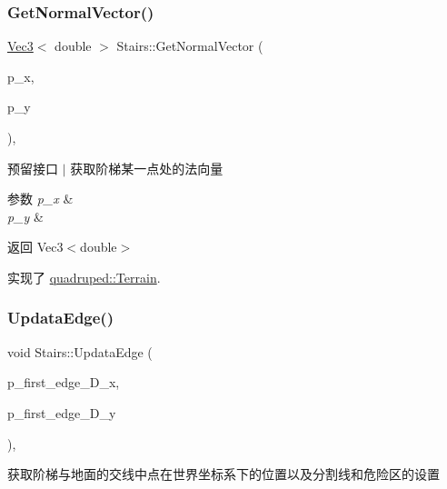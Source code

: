\subsubsection{\texorpdfstring{Get\+Normal\+Vector()}{GetNormalVector()}}
{\footnotesize\ttfamily \hyperlink{cppTypes_8h_a65c27bf97693676535dd0b30ea0ad399}{Vec3}$<$ double $>$ Stairs\+::\+Get\+Normal\+Vector (\begin{DoxyParamCaption}\item[{double}]{p\+\_\+x,  }\item[{double}]{p\+\_\+y }\end{DoxyParamCaption})\hspace{0.3cm}{\ttfamily [override]}, {\ttfamily [virtual]}}



预留接口 $\vert$ 获取阶梯某一点处的法向量 


\begin{DoxyParams}{参数}
{\em p\+\_\+x} & \\
\hline
{\em p\+\_\+y} & \\
\hline
\end{DoxyParams}
\begin{DoxyReturn}{返回}
Vec3$<$double$>$ 
\end{DoxyReturn}


实现了 \hyperlink{classquadruped_1_1Terrain}{quadruped\+::\+Terrain}.

\mbox{\label{classquadruped_1_1Stairs_a37a4cc06123b8eba97a05049e8a5fcd0}} 
\subsubsection{\texorpdfstring{Updata\+Edge()}{UpdataEdge()}}
{\footnotesize\ttfamily void Stairs\+::\+Updata\+Edge (\begin{DoxyParamCaption}\item[{double}]{p\+\_\+first\+\_\+edge\+\_\+\+D\+\_\+x,  }\item[{double}]{p\+\_\+first\+\_\+edge\+\_\+\+D\+\_\+y }\end{DoxyParamCaption})\hspace{0.3cm}{\ttfamily [override]}, {\ttfamily [virtual]}}



获取阶梯与地面的交线中点在世界坐标系下的位置以及分割线和危险区的设置 


